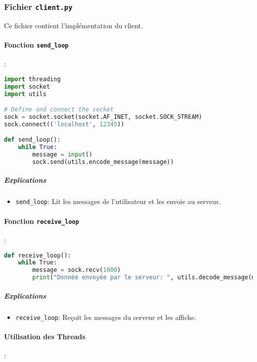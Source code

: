 \documentclass{article}
\begin{document}
\subsubsection{Fichier \texttt{client.py}}

Ce fichier contient l'implémentation du client.

\paragraph{Fonction \texttt{send\_loop}}:

\begin{lstlisting}[language=Python, caption=send\_loop dans client.py]
import threading
import socket
import utils

# Define and connect the socket
sock = socket.socket(socket.AF_INET, socket.SOCK_STREAM)
sock.connect(('localhost', 12345))

def send_loop():
    while True:
        message = input()
        sock.send(utils.encode_message(message))
\end{lstlisting}

\subparagraph{Explications}

\begin{itemize}
    \item \texttt{send\_loop}: Lit les messages de l'utilisateur et les envoie au serveur.
\end{itemize}

\paragraph{Fonction \texttt{receive\_loop}}:

\begin{lstlisting}[language=Python, caption=receive\_loop dans client.py]
def receive_loop():
    while True:
        message = sock.recv(1000)
        print("Donnée envoyée par le serveur: ", utils.decode_message(message))
\end{lstlisting}

\subparagraph{Explications}

\begin{itemize}
    \item \texttt{receive\_loop}: Reçoit les messages du serveur et les affiche.
\end{itemize}

\paragraph{Utilisation des Threads}:
\end{document}
